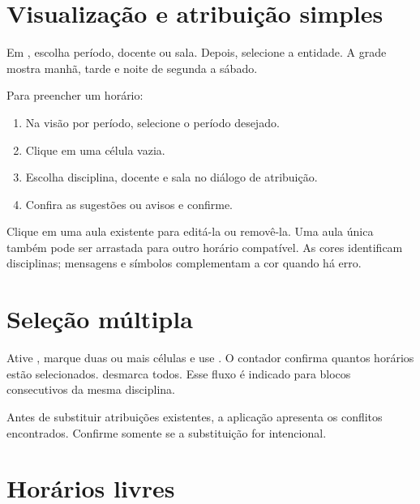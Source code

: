\section{Visualização e atribuição simples}

Em , escolha período, docente ou sala. Depois, selecione a entidade. A grade mostra manhã, tarde e noite de segunda a sábado.

Para preencher um horário:

\begin{enumerate}
  \item Na visão por período, selecione o período desejado.
  \item Clique em uma célula vazia.
  \item Escolha disciplina, docente e sala no diálogo de atribuição.
  \item Confira as sugestões ou avisos e confirme.
\end{enumerate}

Clique em uma aula existente para editá-la ou removê-la. Uma aula única também pode ser arrastada para outro horário compatível. As cores identificam disciplinas; mensagens e símbolos complementam a cor quando há erro.


\section{Seleção múltipla}

Ative , marque duas ou mais células e use . O contador confirma quantos horários estão selecionados.  desmarca todos. Esse fluxo é indicado para blocos consecutivos da mesma disciplina.


Antes de substituir atribuições existentes, a aplicação apresenta os conflitos encontrados. Confirme somente se a substituição for intencional.

\section{Horários livres}

